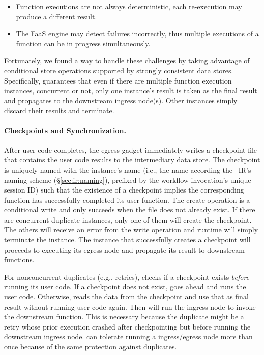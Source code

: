 \begin{itemize}
	\item Function executions are not always deterministic, each re-execution
	may produce a different result.
	\item The FaaS engine may detect failures incorrectly, thus multiple
	executions of a function can be in progress simultaneously.
\end{itemize}

Fortunately, we found a way to handle these challenges by taking advantage of
conditional store operations supported by strongly consistent data stores.
Specifically, \name{} guarantees that even if there are multiple function
execution instances, concurrent or not, only one instance's result is taken as
the final result and propagates to the downstream ingress node(s). Other
instances simply discard their results and terminate.

\paragraph{Checkpoints and Synchronization.}%
After user code completes, the \name{} egress gadget immediately writes a checkpoint file that contains the user code
results to the intermediary data store. The checkpoint is uniquely named with
the instance's name (i.e., the name according the
\name{}~IR's naming scheme (\S\ref{sec:ir:naming}), prefixed by the workflow
invocation's unique session ID) such that the existence of a checkpoint
implies the corresponding function has successfully completed its user
function. The create operation is a conditional write and only succeeds when
the file does not already exist. If there are concurrent duplicate instances,
only one of them will create the checkpoint. The others will receive an error
from the write operation and \name{} runtime will simply terminate the
instance. The instance that successfully creates a checkpoint will proceeds to
executing its egress node and propagate its result to downstream functions.

For nonconcurrent duplicates (e.g., retries), \name{} checks if a checkpoint
exists \emph{before} running its user code. If a checkpoint does not exist,
\name{} goes ahead and runs the user code. Otherwise, \name{} reads the data
from the checkpoint and use that as final result without running user code
again. Then \name{} will run the ingress node to invoke the downstream function.
This is necessary because the duplicate might be a retry whose prior execution
crashed after checkpointing but before running the downstream ingress node. \name{} can
tolerate running a ingress/egress node more than once because of the same protection
against duplicates.

